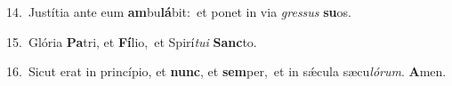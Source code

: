 {\numbfont\textcolor{\numbcolor}{14.}}~Justítia ante eum \textbf{am}\-bu\-\textbf{lá}\-bit:~\star et ponet in via \textit{gres}\-\textit{sus} \textbf{su}\-os.\par
{\numbfont\textcolor{\numbcolor}{15.}}~Glória \textbf{Pa}\-tri, et \textbf{Fí}\-lio,~\star et Spirí\-\textit{tu}\-\textit{i} \textbf{Sanc}\-to.\par
{\numbfont\textcolor{\numbcolor}{16.}}~Sicut erat in princípio, et \textbf{nunc}\-, et \textbf{sem}\-per,~\star et in sǽcula sæcu\-\textit{ló}\-\textit{rum}. \textbf{A}\-men.\par

